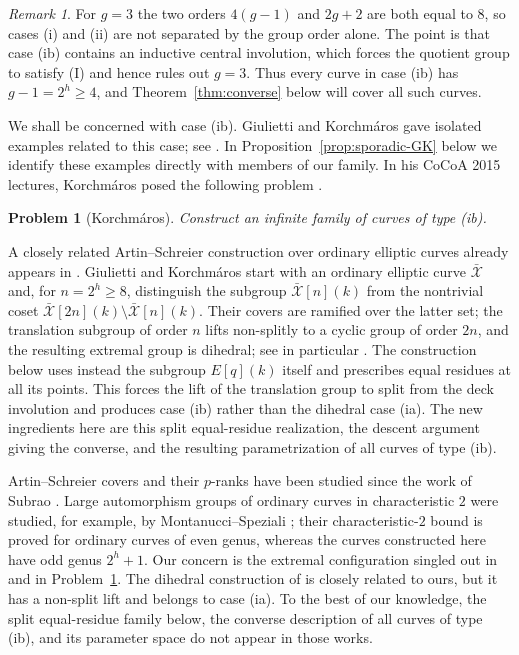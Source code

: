 \documentclass[11pt]{article}
\newtheorem{problem}[theorem]{Problem}
\theoremstyle{remark}
\newtheorem{remark}[theorem]{Remark}
\begin{document}
\begin{remark}
For $g=3$ the two orders $4(g-1)$ and $2g+2$ are both equal to $8$, so
cases \textup{(i)} and \textup{(ii)} are not separated by the group
order alone.  The point is that case \textup{(ib)} contains an inductive
central involution, which forces the quotient group to satisfy
\textup{(I)} and hence rules out $g=3$.  Thus every curve in case
\textup{(ib)} has $g-1=2^h\ge4$, and Theorem~\ref{thm:converse} below
will cover all such curves.
\end{remark}

We shall be concerned with case \textup{(ib)}.  Giulietti and
Korchm\'aros gave isolated examples related to this case; see
\cite[Sections~6.2 and~6.5]{GK2015}.  In
Proposition~\ref{prop:sporadic-GK} below we identify these examples
directly with members of our family.  In his CoCoA 2015 lectures,
Korchm\'aros posed the following problem
\cite[Problem~11]{KorchmarosSlides}.

\begin{problem}[Korchm\'aros]\label{prob:Korchmaros11}
Construct an infinite family of curves of type \textup{(ib)}.
\end{problem}

A closely related Artin--Schreier construction over ordinary elliptic
curves already appears in \cite[Section~5]{GK2015}.  Giulietti and
Korchm\'aros start with an ordinary elliptic curve $\bar{\mathcal X}$ and,
for $n=2^h\ge8$, distinguish the subgroup
$\bar{\mathcal X}[n](k)$ from the nontrivial coset
$\bar{\mathcal X}[2n](k)\setminus\bar{\mathcal X}[n](k)$.  Their covers
are ramified over the latter set; the translation subgroup of order $n$
lifts non-splitly to a cyclic group of order $2n$, and the resulting
extremal group is dihedral; see in particular
\cite[Proposition~5.12 and Theorem~5.14]{GK2015}.  The construction below
uses instead the subgroup $E[q](k)$ itself and prescribes equal residues at
all its points.  This forces the lift of the translation group to split
from the deck involution and produces case \textup{(ib)} rather than the
dihedral case \textup{(ia)}.  The new ingredients here are this
split equal-residue realization, the descent argument giving the converse,
and the resulting parametrization of all curves of type \textup{(ib)}.

Artin--Schreier covers and their $p$-ranks have been studied since the
work of Subrao \cite{Subrao}.  Large automorphism groups of ordinary
curves in characteristic $2$ were studied, for example, by
Montanucci--Speziali \cite{MontanucciSpeziali}; their characteristic-$2$
bound is proved for ordinary curves of even genus, whereas the curves
constructed here have odd genus $2^h+1$.  Our concern is the extremal
configuration singled out in \cite{GK2015} and in
Problem~\ref{prob:Korchmaros11}.  The dihedral construction of
\cite[Section~5]{GK2015} is closely related to ours, but it has a non-split
lift and belongs to case \textup{(ia)}.  To the best of our knowledge, the
split equal-residue family below, the converse description of all curves of
type \textup{(ib)}, and its parameter space do not appear in those works.
\end{document}
